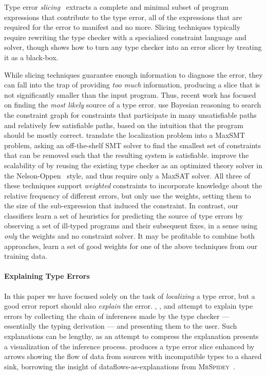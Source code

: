 Type error \emph{slicing}~\citep{Haack2003-vc,Tip2001-qp,Rahli2010-ps}
extracts a complete and minimal subset of program expressions that
contribute to the type error, \ie all of the expressions that are
required for the error to manifest and no more.
%
Slicing techniques typically require rewriting the type checker with a
specialized constraint language and solver, though
\citet{Schilling2011-yf} shows how to turn any type checker into an
error slicer by treating it as a black-box.

While slicing techniques guarantee enough information to diagnose the
error, they can fall into the trap of providing \emph{too much}
information, producing a slice that is not significantly smaller than
the input program.
%
Thus, recent work has focused on finding the \emph{most likely} source
of a type error.
%
\citet{Zhang2014-lv} use Bayesian reasoning to search the constraint
graph for constraints that participate in many unsatisfiable paths and
relatively few satisfiable paths, based on the intuition that the
program should be mostly correct.
%
\citet{Pavlinovic2014-mr} translate the localization problem into a
MaxSMT problem, asking an off-the-shelf SMT solver to find the smallest
set of constraints that can be removed such that the resulting system is
satisfiable.
%
\citet{Loncaric2016-uk} improve the scalability of
\citeauthor{Pavlinovic2014-mr} by reusing the existing type checker as
an optimized theory solver in the Nelson-Oppen~\citeyear{Nelson1979-td}
style, and thus require only a MaxSAT solver.
%
All three of these techniques support \emph{weighted} constraints to
incorporate knowledge about the relative frequency of different errors,
but only \citeauthor{Pavlinovic2014-mr} use the weights, setting them to
the size of the sub-expression that induced the constraint.
%
In contrast, our classifiers learn a set of heuristics for predicting
the source of type errors by observing a set of ill-typed programs and
their subsequent fixes, in a sense using \emph{only} the weights and no
constraint solver.
%
It may be profitable to combine both approaches, \ie learn a set of good
weights for one of the above techniques from our training data.

\paragraph{Explaining Type Errors}
In this paper we have focused solely on the task of \emph{localizing} a
type error, but a good error report should also \emph{explain} the
error.
%
\citet{Wand1986-nw}, \citet{Beaven1993-hb}, and \citet{Duggan1996-by}
attempt to explain type errors by collecting the chain of inferences
made by the type checker --- essentially the typing derivation --- and
presenting them to the user.
%
Such explanations can be lengthy, as an attempt to compress the
explanation \citet{Yang2000-kz} presents a visualization of the
inference process.
%
\citet{Gast2004-zd} produces a type error slice enhanced by arrows
showing the flow of data from sources with incompatible types to a
shared sink, borrowing the insight of dataflows-as-explanations from
\textsc{MrSpidey}~\citep{Flanagan1996-bu}.

